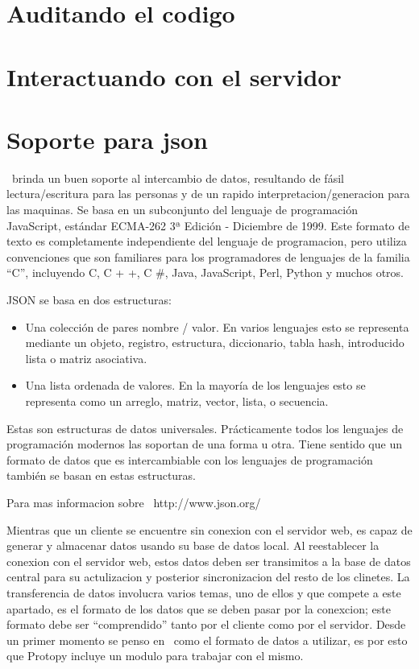 \section{Auditando el codigo}


\section{Interactuando con el servidor}


\section{Soporte para json}
\JSON\ brinda un buen soporte al intercambio de datos, resultando de fásil
lectura/escritura para las personas y de un rapido interpretacion/generacion
para las maquinas. Se basa en un subconjunto del lenguaje de programación
JavaScript, estándar ECMA-262 3ª Edición - Diciembre de 1999. Este formato de
texto es completamente independiente del lenguaje de programacion, pero utiliza
convenciones que son familiares para los programadores de lenguajes de la
familia ``C'', incluyendo C, C + +, C \#, Java, JavaScript, Perl, Python y muchos otros.

JSON se basa en dos estructuras:
\begin{itemize}
  \item Una colección de pares nombre / valor. En varios lenguajes esto se
  representa mediante un objeto, registro, estructura, diccionario, tabla hash,
  introducido lista o matriz asociativa.
  \item Una lista ordenada de valores. En la mayoría de los lenguajes esto se
  representa como un arreglo, matriz, vector, lista, o secuencia.
\end{itemize}

Estas son estructuras de datos universales. Prácticamente todos los lenguajes
de programación modernos las soportan de una forma u otra. Tiene sentido que un
formato de datos que es intercambiable con los lenguajes de programación
también se basan en estas estructuras.

Para mas informacion sobre \JSON\ http://www.json.org/

Mientras que un cliente se encuentre sin conexion con el servidor web, es capaz
de generar y almacenar datos usando su base de datos local. Al reestablecer
la conexion con el servidor web, estos datos deben ser transimitos a la base de
datos central para su actulizacion y posterior sincronizacion del resto de los
clinetes.
La transferencia de datos involucra varios temas, uno de ellos y que compete
a este apartado, es el formato de los datos que se deben pasar por
la conexcion; este formato debe ser ``comprendido'' tanto por el cliente como
por el servidor. Desde un primer momento se penso en \JSON\ como el formato
de datos a utilizar, es por esto que Protopy incluye un modulo para trabajar con el mismo.

